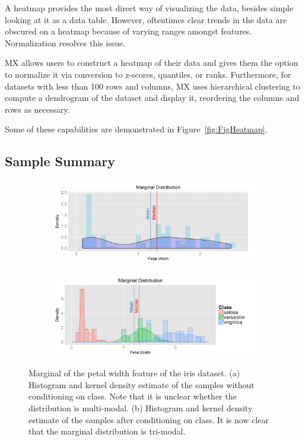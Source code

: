 \documentclass[12pt]{article}
\begin{document}
A heatmap provides the most direct way of visualizing the data, besides simple looking at it as a data table. However, oftentimes clear trends in the data are obscured on a heatmap because of varying ranges amongst features. Normalization resolves this issue.

MX allows users to construct a heatmap of their data and gives them the option to normalize it via conversion to z-scores, quantiles, or ranks. Furthermore, for datasets with less than 100 rows and columns, MX uses hierarchical clustering to compute a dendrogram of the dataset and display it, reordering the columns and rows as necessary. 

Some of these capabilities are demonstrated in Figure~\ref{fig:FigHeatmap}. 

\subsection{Sample Summary}
\label{subsec:SubSecSample}

\begin{figure}[t!]
	\centering
	\begin{subfigure}[b]{0.8\textwidth}
		\includegraphics[width=\textwidth]{Figures/Iris/MarginalPetalWidthnocond.png}
		\subcaption{}
		\label{fig:FigMarginalNoCond}
	\end{subfigure}
	\begin{subfigure}[b]{0.8\textwidth}
		\includegraphics[width=\textwidth]{Figures/Iris/MarginalPetalWidth.png}
		\subcaption{}
		\label{fig:FigMarginal}
	\end{subfigure}
	\caption{Marginal of the petal width feature of the iris dataset. (a) Histogram and kernel density estimate of the samples without conditioning on class. Note that it is unclear whether the distribution is multi-modal. (b) Histogram and kernel density estimate of the samples after conditioning on class. It is now clear that the marginal distribution is tri-modal.}
	\label{fig:FigSample}
\end{figure}
\end{document}
